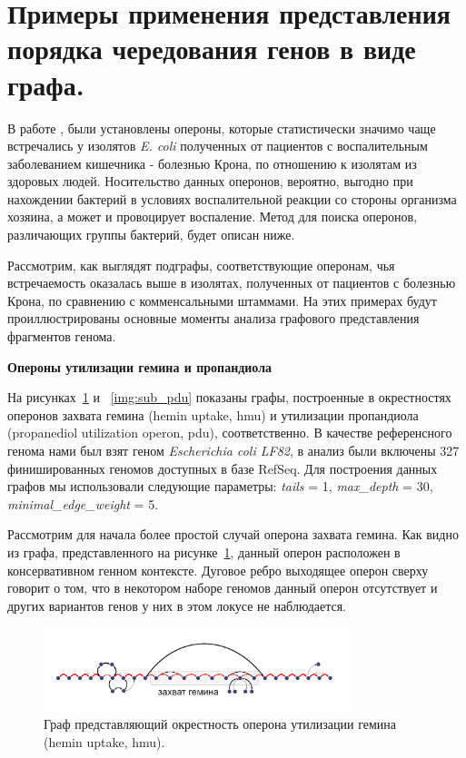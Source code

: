 \section{Примеры применения представления порядка чередования генов в виде графа.}

В работе \cite{rakitina2017genome}, были установлены опероны, которые статистически значимо чаще встречались у изолятов \textit{E. coli} полученных от пациентов с воспалительным заболеванием кишечника - болезнью Крона, по отношению к изолятам из здоровых людей. Носительство данных оперонов, вероятно, выгодно при нахождении бактерий в условиях воспалительной реакции со стороны организма хозяина, а может и провоцирует воспаление. Метод для поиска оперонов, различающих группы бактерий, будет описан ниже.

Рассмотрим, как выглядят подграфы, соответствующие оперонам, чья встречаемость оказалась выше в изолятах, полученных от пациентов с болезнью Крона, по сравнению с комменсальными штаммами. На этих примерах будут проиллюстрированы основные моменты анализа графового представления фрагментов генома. 

\textbf{Опероны утилизации гемина и пропандиола}

На рисунках~\ref{img:sub_hem} и ~\ref{img:sub_pdu} показаны графы, построенные в окрестностях оперонов захвата гемина (hemin uptake, hmu) и утилизации пропандиола (propanediol utilization operon, pdu), соответственно. В качестве референсного генома нами был взят геном \textit{Escherichia coli LF82}, в анализ были включены 327 финишированных геномов доступных в базе RefSeq. Для построения данных графов мы использовали следующие параметры: \textit{tails} = 1, \textit{max\_depth} = 30, \textit{minimal\_edge\_weight} = 5. 

Рассмотрим для начала более простой случай оперона захвата гемина. Как видно из графа, представленного на рисунке~\ref{img:sub_hem}, данный оперон расположен в консервативном генном контексте. Дуговое ребро выходящее оперон сверху говорит о том, что в некотором наборе геномов данный оперон отсутствует и других вариантов генов у них в этом локусе не наблюдается. 

\begin{figure}[!ht] 
  \center
  \includegraphics[width=0.8\textwidth]{Dissertation/images/subgraphs/hemin.png}
  \caption{Граф представляющий окрестность оперона утилизации гемина (hemin uptake, hmu).}
  \label{img:sub_hem} 
\end{figure}


